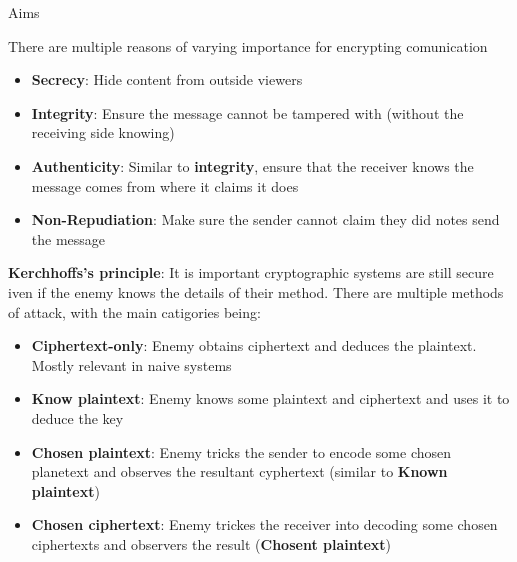 \documentclass[12pt, letterpaper]{article}
\begin{document}
\begin{section}{Aims}

  There are multiple reasons of varying importance for encrypting comunication
  \begin{itemize}
    \item \textbf{Secrecy}: Hide content from outside viewers
    \item \textbf{Integrity}: Ensure the message cannot be tampered with
          (without the receiving side knowing)
    \item \textbf{Authenticity}: Similar to \textbf{integrity}, ensure that the
          receiver knows the message comes from where it claims it does
    \item \textbf{Non-Repudiation}: Make sure the sender cannot claim they did
          notes send the message
  \end{itemize}
  \textbf{Kerchhoffs's principle}: It is important cryptographic systems are
  still secure iven if the enemy knows the details of their method.
  There are multiple methods of attack, with the main catigories being:
  \begin{itemize}
    \item \textbf{Ciphertext-only}: Enemy obtains ciphertext and deduces the
          plaintext. Mostly relevant in naive systems
    \item \textbf{Know plaintext}: Enemy knows some plaintext and ciphertext and
          uses it to deduce the key
    \item \textbf{Chosen plaintext}: Enemy tricks the sender to encode some
          chosen planetext and observes the resultant cyphertext (similar to
          \textbf{Known plaintext})
    \item \textbf{Chosen ciphertext}: Enemy trickes the receiver into decoding
          some chosen ciphertexts and observers the result (\textbf{Chosent
          plaintext})
    \end{itemize}

\end{section}
\end{document}
